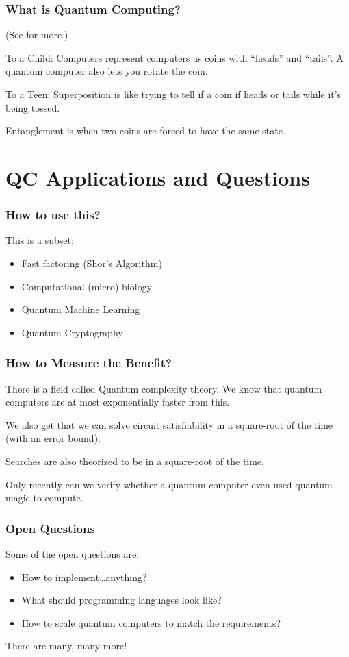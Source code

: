\documentclass{beamer}
\begin{document}
\begin{frame}
\frametitle{What is Quantum Computing?}

(See \cite{5-levels} for more.)

\begin{block}{To a Child:}
Computers represent computers as coins with ``heads'' and ``tails''. A quantum computer also lets you rotate the coin.
\end{block}

\begin{block}{To a Teen:}
Superposition is like trying to tell if a coin if heads or tails while it's being tossed.

Entanglement is when two coins are forced to have the same state.
\end{block}
\end{frame}

\section{QC Applications and Questions}

\begin{frame}
\frametitle{How to use this?}
This is a subset:
\begin{itemize}
    \item Fast factoring (Shor's Algorithm)
    \item Computational (micro)-biology
    \item Quantum Machine Learning
    \item Quantum Cryptography
\end{itemize}
\end{frame}

\begin{frame}
\frametitle{How to Measure the Benefit?}
There is a field called Quantum complexity theory. We know that quantum computers are at most exponentially faster
from this.

We also get that we can solve circuit satisfiability in a square-root of the time (with an error bound).

Searches are also theorized to be in a square-root of the time. \cite{q-complexity}

Only recently can we verify whether a quantum computer even used quantum magic to compute. \cite{q-verification}
\end{frame}

\begin{frame}
\frametitle{Open Questions}
Some of the open questions are:
\begin{itemize}
    \item How to implement\dots anything?
    \item What should programming languages look like?
    \item How to scale quantum computers to match the requirements?
\end{itemize}

There are many, many more!
\end{frame}
\end{document}
